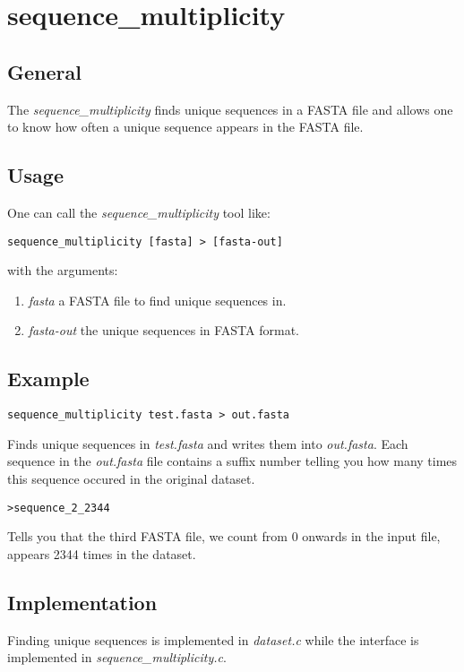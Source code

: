 \section{sequence\_multiplicity} \label{sec-seqmult}

\subsection{General}

The \emph{sequence\_multiplicity} finds unique sequences in a FASTA file and
allows one to know how often a unique sequence appears in the FASTA
file.

\subsection{Usage}

One can call the \emph{sequence\_multiplicity} tool like:
\begin{lstlisting}
sequence_multiplicity [fasta] > [fasta-out]
\end{lstlisting}
with the arguments:
\begin{enumerate}
\item \emph{fasta} a FASTA file to find unique sequences in.
\item \emph{fasta-out} the unique sequences in FASTA format.
\end{enumerate}

\subsection{Example}
\begin{lstlisting}
sequence_multiplicity test.fasta > out.fasta
\end{lstlisting}
Finds unique sequences in \emph{test.fasta} and writes them into
\emph{out.fasta}. Each sequence in the \emph{out.fasta} file contains
a suffix number telling you how many times this sequence occured in
the original dataset. 
\begin{lstlisting}
>sequence_2_2344 
\end{lstlisting}
Tells you that the third FASTA file, we count from 0 onwards in the
input file, appears 2344 times in the dataset.  

\subsection{Implementation}
Finding unique sequences is implemented in \emph{dataset.c} while
the interface is implemented in \emph{sequence\_multiplicity.c}. 
